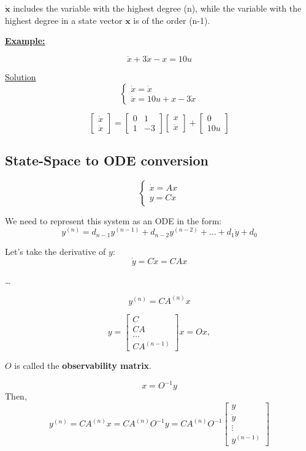 $\dot{\mathbf{x}}$ includes the variable with the highest degree (n), while the variable with the highest degree in a state vector $\mathbf{x}$ is of the order (n-1).


\begin{center}
    \underline{\textbf{Example:}}
\end{center}

\[\ddot x + 3 \dot x - x = 10 u\]

\underline{Solution}
\[
\begin{cases}
    \dot{x} = \dot{x} \\
    \ddot{x} = 10u +  x - 3\dot x
\end{cases}
\]

\[
\begin{bmatrix}
\dot{x} \\
\ddot{x}
\end{bmatrix} = 
\begin{bmatrix}
0 & 1  \\
1 & -3  
\end{bmatrix}
\begin{bmatrix}
x \\
\dot{x} 
\end{bmatrix} + 
\begin{bmatrix}
0 \\
10u 
\end{bmatrix}
\]


\subsection{State-Space to ODE conversion}

\[
\begin{cases}
\dot{x} = Ax \\
y = Cx
\end{cases}
\]

We need to represent this system as an ODE in the form:
\[y^{(n)} = d_{n-1}y^{(n-1)} + d_{n-2}y^{(n-2)} + \dots + d_1 \dot{y} + d_0 \]

Let's take the derivative of \(y\):
\[\dot{y} = C\dot{x} = CAx\]
\begin{center}
    \dots
\end{center}
\[y^{(n)} = CA^{(n)} x\]

\[y = \begin{bmatrix} C \\ CA \\ \dots \\ CA^{(n-1)} \end{bmatrix} x = Ox, \]

\(O\) is called the \textbf{observability matrix}.

\[x  = O^{-1} y \]
Then, 
\[y^{(n)} = CA^{(n)} x = CA^{(n)}O^{-1} y = CA^{(n)}O^{-1}  \begin{bmatrix} y \\ \dot{y} \\ \vdots \\ y^{(n-1)}\end{bmatrix}\]
